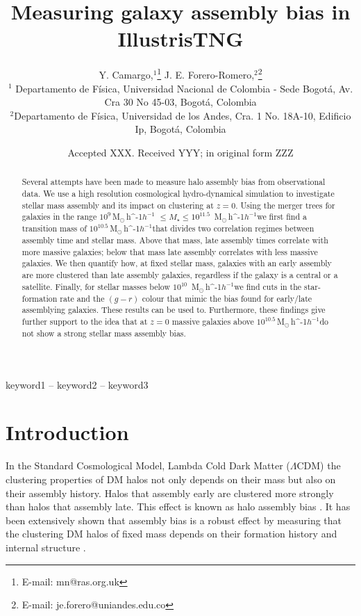\documentclass[fleqn,usenatbib]{mnras}
\title[Galaxy Assembly Bias]{Measuring galaxy assembly bias in IllustrisTNG}
\author[Camargo, Y. \& Forero-Romero J. E.]{
Y. Camargo,$^{1}$\thanks{E-mail: mn@ras.org.uk}
J. E. Forero-Romero,$^{2}$\thanks{E-mail: je.forero@uniandes.edu.co}
\\
$^{1}$
Departamento de F\'isica, Universidad Nacional de Colombia - Sede Bogot\'a, Av. Cra 30 No 45-03, Bogot\'a, Colombia\\
$^{2}$Departamento de F\'isica, Universidad de los Andes, Cra. 1 No.
18A-10, Edificio Ip, Bogot\'a, Colombia\\
}
\date{Accepted XXX. Received YYY; in original form ZZZ}
\newcommand{\Msunh}{\,{\rm M}$_{\odot}$\,\ifmmode h^{-1}\else $h^{-1}$\fi}
\begin{document}
\label{firstpage}
\pagerange{\pageref{firstpage}--\pageref{lastpage}}
\maketitle

\begin{abstract}

Several attempts have been made to measure halo assembly bias from
 observational data.
    We use a high resolution cosmological hydro-dynamical simulation
    to investigate stellar mass assembly 
    and its impact on clustering at $z=0$.
    Using the merger trees for galaxies in the range $10^{9}$\Msunh
    $\leq M_{\star} \leq 10^{11.5}$ \Msunh we first find a transition
    mass of $10^{10.5}$\Msunh that divides two 
    correlation regimes between assembly time and stellar mass.
    Above that mass, late assembly times correlate with more massive
    galaxies; below that mass late assembly correlates with less massive
galaxies.
We then quantify how, at fixed stellar mass, galaxies with an early
assembly
are more clustered than late assembly galaxies, regardless if the galaxy
is a central or a satellite.
Finally, for stellar masses below $10^{10}$ \Msunh we find 
cuts in the star-formation rate and the $(g-r)$ colour that mimic
the bias found for early/late assemblying galaxies.
These results can be used to.
Furthermore, these findings give further support to the idea that at
$z=0$  massive galaxies above $10^{10.5}$\Msunh do not show a strong
stellar mass assembly bias.
\end{abstract}

\begin{keywords}
keyword1 -- keyword2 -- keyword3
\end{keywords}



\section{Introduction}
In the Standard Cosmological Model, Lambda Cold Dark Matter
($\Lambda$CDM) the clustering properties of DM halos not only depends on their mass
but also on their assembly history.
Halos that assembly early are clustered more strongly
than halos that assembly late.
This effect is known as halo assembly bias \citep{2005MNRAS.363L..66G}.
It has been extensively shown  that
assembly bias is a robust effect
by measuring that the clustering DM halos of fixed mass depends on their formation history and internal structure \citep{2006ApJ...652...71W,2008ApJ...687...12D}.
\end{document}

